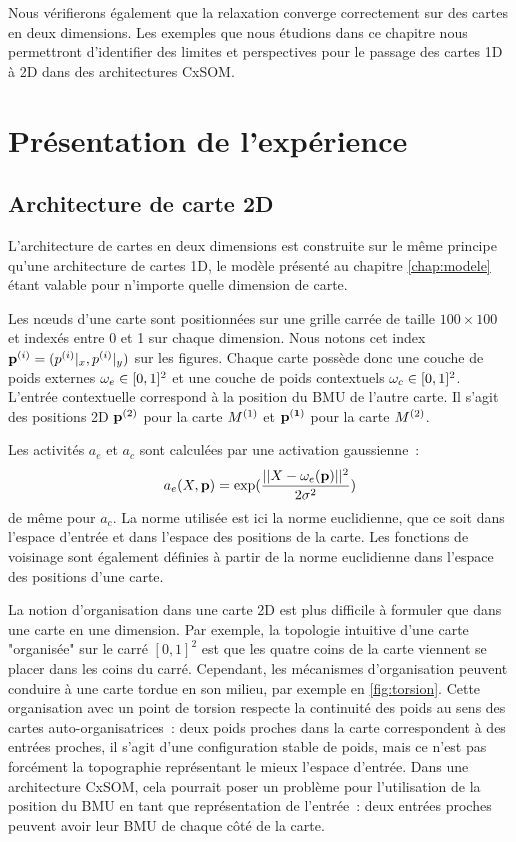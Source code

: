 \documentclass[../main]{subfiles}
\begin{document}
Nous vérifierons également que la relaxation converge correctement sur des cartes en deux dimensions.
Les exemples que nous étudions dans ce chapitre nous permettront d'identifier des limites et perspectives pour le passage des cartes 1D à 2D dans des architectures CxSOM.

\section{Présentation de l'expérience}

\subsection{Architecture de carte 2D}

L'architecture de cartes en deux dimensions est construite sur le même principe qu'une architecture de cartes 1D, le modèle présenté au chapitre \ref{chap:modele} étant valable pour n'importe quelle dimension de carte.

Les n\oe{}uds d'une carte sont positionnées sur une grille carrée de taille $100 \times 100$ et indexés entre 0 et 1 sur chaque dimension. Nous notons cet index $\mathbf{p}^{({i})} = (p^{({i})}|_x, p^{({i})}|_y)$ sur les figures. 
Chaque carte possède donc une couche de poids externes $\omega_{e} \in [0,1]^2$ et une couche de poids contextuels $\omega_c \in [0,1]^2$.
L'entrée contextuelle correspond à la position du BMU de l'autre carte. Il s'agit des positions 2D $\mathbf{p}^{({2})}$ pour la carte $M^{({1})}$ et $\mathbf{p^{({1})}}$ pour la carte $M^{({2})}$. 


Les activités $a_e$ et $a_c$ sont calculées par une activation gaussienne~:
$$a_e(X,\mathbf{p}) = \exp(\frac{||X - \omega_e(\mathbf{p}) ||^2}{2\sigma^2})$$
de même pour $a_c$.
La norme utilisée est ici la norme euclidienne, que ce soit dans l'espace d'entrée et dans l'espace des positions de la carte. Les fonctions de voisinage sont également définies à partir de la norme euclidienne dans l'espace des positions d'une carte.

La notion d'organisation dans une carte 2D est plus difficile à formuler que dans une carte en une dimension.
Par exemple, la topologie intuitive d'une carte "organisée" sur le carré $[0,1]^2$ est que les quatre coins de la carte viennent se placer dans les coins du carré. Cependant, les mécanismes d'organisation peuvent conduire à une carte tordue en son milieu, par exemple en \ref{fig:torsion}. 
Cette organisation avec un point de torsion respecte la continuité des poids au sens des cartes auto-organisatrices~: deux poids proches dans la carte correspondent à des entrées proches, il s'agit d'une configuration stable de poids, mais ce n'est pas forcément la topographie représentant le mieux l'espace d'entrée. 
Dans une architecture CxSOM, cela pourrait poser un problème pour l'utilisation de la position du BMU en tant que représentation de l'entrée~: deux entrées proches peuvent avoir leur BMU de chaque côté de la carte.
\end{document}
